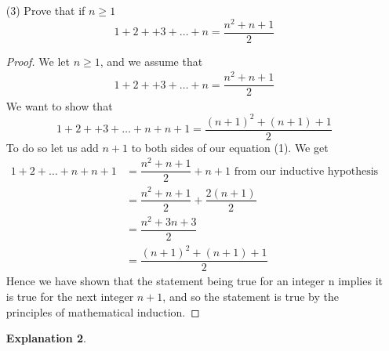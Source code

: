\documentclass[12pt]{article}
\theoremstyle{plain}
\theoremstyle{plain}
\theoremstyle{definition}
\newtheorem*{remark}{Explanation}
\begin{document}
\begin{enumerate}
\begin{remark}
    \end{remark}
    \item [(3)] Prove that if \(n \ge 1\) \[1 + 2 + +3 + \dots +n = \dfrac{n^2+n+1}{2}\] \begin{proof}
        We let \(n \ge 1\), and we assume that \begin{align}
            1 + 2 + +3 + \dots +n = \dfrac{n^2+n+1}{2}
        \end{align}
        We want to show that \[1 + 2 + +3 + \dots +n + n+1  = \dfrac{(n+1)^2+(n+1)+1}{2}\]
        To do so let us add \(n+1\) to both sides of our equation (1). We get \begin{align*}
            1 + 2 + \dots + n + n+1 &= \dfrac{n^2+n+1}{2} + n + 1  \text{ from our inductive hypothesis}\\
            & = \dfrac{n^2 + n +1}{2} + \dfrac{2(n+1)}{2}\\
            & = \dfrac{n^2 + 3n + 3}{2} \\
            & = \dfrac{(n+1)^2+(n+1)+1}{2}
        \end{align*}
        Hence we have shown that the statement being true for an integer n implies it is true for the next integer \(n+1\), and so the statement is true by the principles of mathematical induction.
    \end{proof}
    \begin{remark}
    \end{remark}
\end{enumerate}
\end{document}
